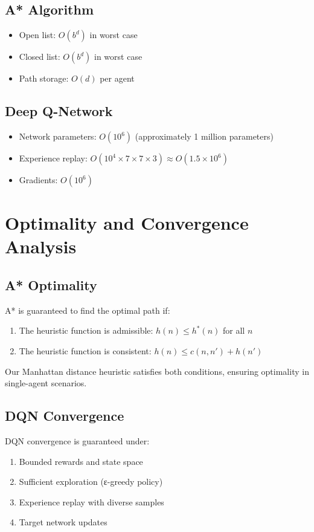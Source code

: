 \documentclass[12pt, a4paper]{report}
\begin{document}
\subsection{A* Algorithm}
\begin{itemize}
    \item Open list: $O(b^d)$ in worst case
    \item Closed list: $O(b^d)$ in worst case
    \item Path storage: $O(d)$ per agent
\end{itemize}

\subsection{Deep Q-Network}
\begin{itemize}
    \item Network parameters: $O(10^6)$ (approximately 1 million parameters)
    \item Experience replay: $O(10^4 \times 7 \times 7 \times 3) \approx O(1.5 \times 10^6)$
    \item Gradients: $O(10^6)$
\end{itemize}

\section{Optimality and Convergence Analysis}

\subsection{A* Optimality}
A* is guaranteed to find the optimal path if:
\begin{enumerate}
    \item The heuristic function is admissible: $h(n) \leq h^*(n)$ for all $n$
    \item The heuristic function is consistent: $h(n) \leq c(n,n') + h(n')$
\end{enumerate}

Our Manhattan distance heuristic satisfies both conditions, ensuring optimality in single-agent scenarios.

\subsection{DQN Convergence}
DQN convergence is guaranteed under:
\begin{enumerate}
    \item Bounded rewards and state space
    \item Sufficient exploration (ε-greedy policy)
    \item Experience replay with diverse samples
    \item Target network updates
\end{enumerate}
\end{document}
